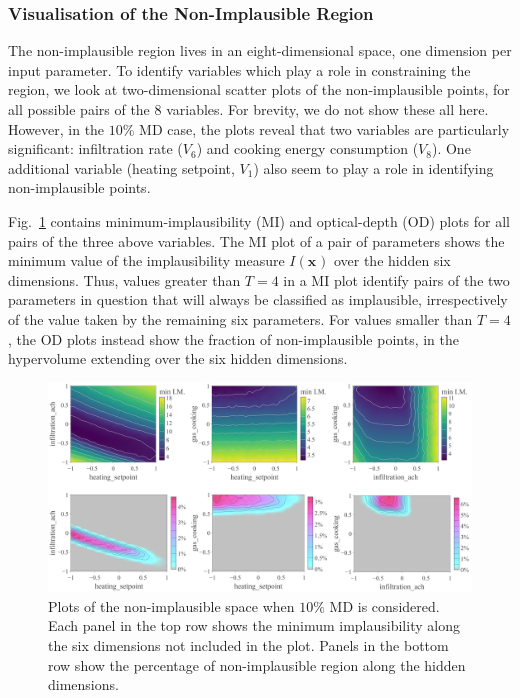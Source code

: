 \documentclass[preprint,12pt, sort&compress]{elsarticle}
\newcommand{\bd}[1]{\boldsymbol{#1}}
\newcommand{\x}[1][]{\bd{x_{#1}}}
\begin{document}

\subsubsection{Visualisation of the Non-Implausible Region}

The non-implausible region lives in an eight-dimensional space, one dimension per input parameter. To identify variables which play a role in constraining the region, we look at two-dimensional scatter plots of the non-implausible points, for all possible pairs of the 8 variables. For brevity, we do not show these all here. However, in the $10\%$ MD case, the plots reveal that two variables are particularly significant: infiltration rate ($V_6$) and cooking energy consumption ($V_8$). One additional variable (heating setpoint, $V_1$) also seem to play a role in identifying non-implausible points.

Fig.~\ref{Fig_NI_gas_10} contains minimum-implausibility (MI) and optical-depth (OD) plots for all pairs of the three above variables. The MI plot of a pair of parameters shows the minimum value of the implausibility measure $I(\x)$ over the hidden six dimensions. Thus, values greater than $T=4$ in a MI plot identify pairs of the two parameters in question that will always be classified as implausible, irrespectively of the value taken by the remaining six parameters. For values smaller than $T=4$, the OD plots instead show the fraction of non-implausible points, in the hypervolume extending over the six hidden dimensions. 

\begin{figure}
\includegraphics[width=\textwidth]{Non-Implausible_Plots/Gas/Fig1}
\caption{Plots of the non-implausible space when $10\%$ MD is considered. Each panel in the top row shows the minimum implausibility along the six dimensions not included in the plot. Panels in the bottom row show the percentage of non-implausible region along the hidden dimensions.}
\label{Fig_NI_gas_10}
\end{figure}
\end{document}
